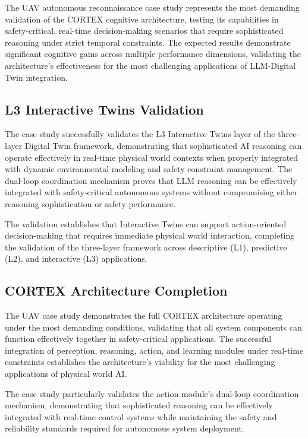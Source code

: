 The UAV autonomous reconnaissance case study represents the most demanding validation of the CORTEX cognitive architecture, testing its capabilities in safety-critical, real-time decision-making scenarios that require sophisticated reasoning under strict temporal constraints. The expected results demonstrate significant cognitive gains across multiple performance dimensions, validating the architecture's effectiveness for the most challenging applications of LLM-Digital Twin integration.

\subsection{L3 Interactive Twins Validation}

The case study successfully validates the L3 Interactive Twins layer of the three-layer Digital Twin framework, demonstrating that sophisticated AI reasoning can operate effectively in real-time physical world contexts when properly integrated with dynamic environmental modeling and safety constraint management. The dual-loop coordination mechanism proves that LLM reasoning can be effectively integrated with safety-critical autonomous systems without compromising either reasoning sophistication or safety performance.

The validation establishes that Interactive Twins can support action-oriented decision-making that requires immediate physical world interaction, completing the validation of the three-layer framework across descriptive (L1), predictive (L2), and interactive (L3) applications.

\subsection{CORTEX Architecture Completion}

The UAV case study demonstrates the full CORTEX architecture operating under the most demanding conditions, validating that all system components can function effectively together in safety-critical applications. The successful integration of perception, reasoning, action, and learning modules under real-time constraints establishes the architecture's viability for the most challenging applications of physical world AI.

The case study particularly validates the action module's dual-loop coordination mechanism, demonstrating that sophisticated reasoning can be effectively integrated with real-time control systems while maintaining the safety and reliability standards required for autonomous system deployment.

